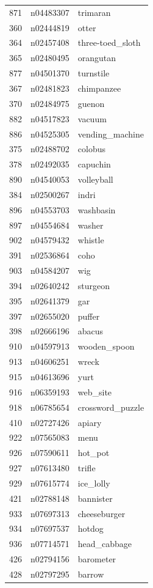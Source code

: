 \begin{table}
\begin{tabular}{cll}
871 & n04483307 & trimaran \\
360 & n02444819 & otter \\
364 & n02457408 & three-toed_sloth \\
365 & n02480495 & orangutan \\
877 & n04501370 & turnstile \\
367 & n02481823 & chimpanzee \\
370 & n02484975 & guenon \\
882 & n04517823 & vacuum \\
886 & n04525305 & vending_machine \\
375 & n02488702 & colobus \\
378 & n02492035 & capuchin \\
890 & n04540053 & volleyball \\
384 & n02500267 & indri \\
896 & n04553703 & washbasin \\
897 & n04554684 & washer \\
902 & n04579432 & whistle \\
391 & n02536864 & coho \\
903 & n04584207 & wig \\
394 & n02640242 & sturgeon \\
395 & n02641379 & gar \\
397 & n02655020 & puffer \\
398 & n02666196 & abacus \\
910 & n04597913 & wooden_spoon \\
913 & n04606251 & wreck \\
915 & n04613696 & yurt \\
916 & n06359193 & web_site \\
918 & n06785654 & crossword_puzzle \\
410 & n02727426 & apiary \\
922 & n07565083 & menu \\
926 & n07590611 & hot_pot \\
927 & n07613480 & trifle \\
929 & n07615774 & ice_lolly \\
421 & n02788148 & bannister \\
933 & n07697313 & cheeseburger \\
934 & n07697537 & hotdog \\
936 & n07714571 & head_cabbage \\
426 & n02794156 & barometer \\
428 & n02797295 & barrow \\

\end{tabular}
\end{table}
